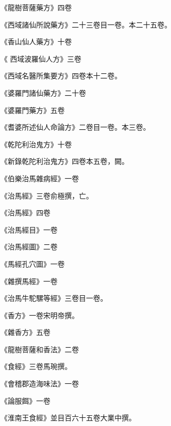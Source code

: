 \begin{pinyinscope}
 《龍樹菩薩藥方》四卷



 《西域諸仙所說藥方》二十三卷目一卷。本二十五卷。



 《香山仙人藥方》十卷



 《
 西域波羅仙人方》三卷



 《西域名醫所集要方》四卷本十二卷。



 《婆羅門諸仙藥方》二十卷



 《婆羅門藥方》五卷



 《耆婆所述仙人命論方》二卷目一卷。本三卷。



 《乾陀利治鬼方》十卷



 《新錄乾陀利治鬼方》四卷本五卷，闕。



 《伯樂治馬雜病經》一卷



 《治馬經》三卷俞極撰，亡。



 《治馬經》四卷



 《治馬經目》一卷



 《治馬經圖》二卷



 《馬經孔穴圖》一卷



 《雜撰馬經》一卷



 《治馬牛駝騾等經》三卷目一卷。



 《香方》一卷宋明帝撰。



 《雜香方》五卷



 《龍樹菩薩和香法》二卷



 《食經》三卷馬琬撰。



 《會稽郡造海味法》一卷



 《論服餌》一卷



 《淮南王食經》並目百六十五卷大業中撰。




\end{pinyinscope}
